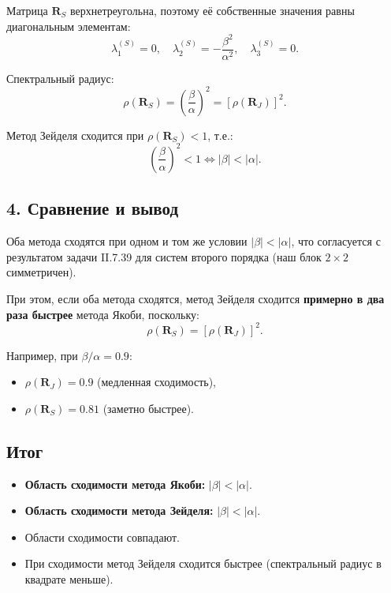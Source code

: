\documentclass{article}
\begin{document}
Матрица $\mathbf{R}_S$ верхнетреугольна, поэтому её собственные значения равны диагональным элементам:
\begin{equation}
\lambda_1^{(S)} = 0, \quad \lambda_2^{(S)} = -\frac{\beta^2}{\alpha^2}, \quad \lambda_3^{(S)} = 0.
\end{equation}

Спектральный радиус:
\begin{equation}
\rho(\mathbf{R}_S) = \left(\frac{\beta}{\alpha}\right)^2 = \left[\rho(\mathbf{R}_J)\right]^2.
\end{equation}

Метод Зейделя сходится при $\rho(\mathbf{R}_S) < 1$, т.е.:
\begin{equation}
\left(\frac{\beta}{\alpha}\right)^2 < 1 \iff \boxed{|\beta| < |\alpha|.}
\end{equation}

\subsection*{4. Сравнение и вывод}

Оба метода сходятся при одном и том же условии $|\beta| < |\alpha|$, что согласуется с результатом задачи II.7.39 для систем второго порядка (наш блок $2\times 2$ симметричен).

При этом, если оба метода сходятся, метод Зейделя сходится \textbf{примерно в два раза быстрее} метода Якоби, поскольку:
\begin{equation}
\rho(\mathbf{R}_S) = [\rho(\mathbf{R}_J)]^2.
\end{equation}

Например, при $\beta/\alpha = 0.9$:
\begin{itemize}
\item $\rho(\mathbf{R}_J) = 0.9$ (медленная сходимость),
\item $\rho(\mathbf{R}_S) = 0.81$ (заметно быстрее).
\end{itemize}

\subsection*{Итог}

\begin{itemize}
\item \textbf{Область сходимости метода Якоби:} $|\beta| < |\alpha|$.
\item \textbf{Область сходимости метода Зейделя:} $|\beta| < |\alpha|$.
\item Области сходимости совпадают.
\item При сходимости метод Зейделя сходится быстрее (спектральный радиус в квадрате меньше).
\end{itemize}
\end{document}

